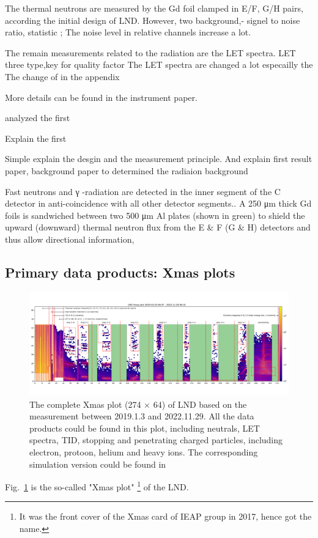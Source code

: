 The thermal neutrons are measured by the Gd foil clamped in E/F, G/H pairs, according the initial design of \ac{LND}. However, two 
background,- signel to noise ratio, statistic ; The noise level in relative channels increase a lot.

The remain measurements related to the radiation are the \ac{LET} spectra. LET three type,key for quality factor
The LET spectra are changed a lot especailly the 
The change of in the appendix

More details can be found in the instrument paper.


\citep{Zhang-2020-LND-firstresults} analyzed the first

Explain the first 


Simple explain the desgin and the measurement principle.
And explain first result paper, background paper to determined the radiaion background

Fast neutrons and
γ -radiation are detected in the inner segment of the C detector in anti-coincidence with
all other detector segments.. A 250 μm thick Gd foils is sandwiched
between two 500 μm Al plates (shown in green) to shield the upward (downward) thermal
neutron flux from the E & F (G & H) detectors and thus allow directional information,



\subsection{Primary data products: Xmas plots}
\begin{figure}
    \centerfloat
    \includegraphics[width =\textheight, height = 0.6\textheight, angle = 90]{images/xmas-2019-01-03To2022-11-29.png}
    \caption[LND Xmas plot based on the measurement between 2019.1.3 and 2022.11.29]{The complete Xmas plot (274 $\times$ 64) of LND based on the measurement between 2019.1.3 and 2022.11.29. All the data products could be found in this plot, including neutrals, \ac{LET} spectra, \ac{TID}, stopping and penetrating charged particles, including electron, protoon, helium and heavy ions. The corresponding simulation version could be found in \citep{Wimmer2020SSRv}}
    \label{Fig: measurement_Xmas}
\end{figure}
\clearpage
Fig.~\ref{Fig: measurement_Xmas} is the so-called "Xmas plot" \footnote{It was the front cover of the Xmas card of IEAP group in 2017, hence got the name.} of the LND. 

